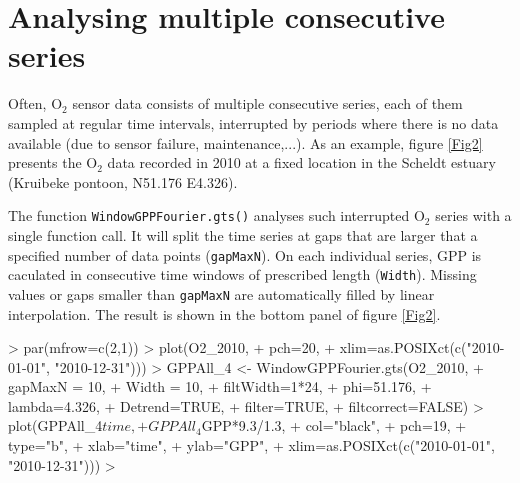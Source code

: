 \documentclass[10pt,a4wide]{article}
\newcommand{\Ox}{\mathrm{O_2}}
\begin{document}
\section{Analysing multiple consecutive series}
Often, $\Ox$ sensor data consists of multiple consecutive series, each of them sampled at regular time intervals, interrupted by periods where there is no data available (due to sensor failure, maintenance,...). As an example, figure \ref{Fig2} presents the $\Ox$ data recorded in 2010 at a fixed location in the Scheldt estuary (Kruibeke pontoon, N51.176 E4.326). 

The function \texttt{WindowGPPFourier.gts()} analyses such interrupted $\Ox$ series with a single function call. It will split the time series at gaps that are larger that a specified number of data points (\texttt{gapMaxN}). On each individual series, GPP is caculated in consecutive time windows of prescribed length (\texttt{Width}). Missing values or gaps smaller than \texttt{gapMaxN} are automatically filled by linear interpolation. The result is shown in the bottom panel of figure \ref{Fig2}.

\begin{Schunk}
\begin{Sinput}
> par(mfrow=c(2,1))
> plot(O2_2010, 
+       pch=20,
+       xlim=as.POSIXct(c("2010-01-01", "2010-12-31")))
> GPPAll_4 <- WindowGPPFourier.gts(O2_2010, 
+                                   gapMaxN = 10, 
+                                   Width = 10, 
+                                   filtWidth=1*24, 
+                                   phi=51.176,
+                                   lambda=4.326, 
+                                   Detrend=TRUE, 
+                                   filter=TRUE, 
+                                   filtcorrect=FALSE)
> plot(GPPAll_4$time,
+       GPPAll_4$GPP*9.3/1.3, 
+       col="black", 
+       pch=19, 
+       type="b",
+       xlab="time", 
+       ylab="GPP", 
+       xlim=as.POSIXct(c("2010-01-01", "2010-12-31")))
> 
\end{Sinput}
\end{Schunk}
\end{document}
